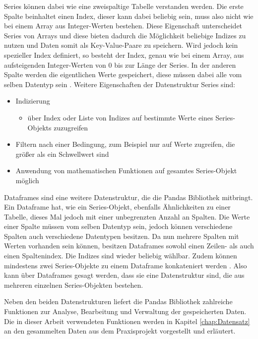 Series können dabei wie eine zweispaltige Tabelle verstanden werden. Die erste Spalte beinhaltet einen Index, dieser kann
dabei beliebig sein, muss also nicht wie bei einem Array aus Integer-Werten bestehen. Diese Eigenschaft unterscheidet Series von Arrays
und diese bieten dadurch die Möglichkeit beliebige Indizes zu nutzen und Daten somit als Key-Value-Paare zu speichern. Wird jedoch kein spezieller Index definiert,
so besteht der Index, genau wie bei einem Array, aus aufsteigenden Integer-Werten von 0 bis zur Länge der Series. In der anderen Spalte
werden die eigentlichen Werte gespeichert, diese müssen dabei alle vom selben Datentyp sein \cite[vgl. S.254f.]{NumerischesPython}. 
Weitere Eigenschaften der Datenstruktur Series sind:
\begin{itemize}
    \item Indizierung \cite[vgl. S.256]{NumerischesPython}
    \begin{itemize}
        \item über Index oder Liste von Indizes auf bestimmte Werte eines Series-Objekts zuzugreifen
    \end{itemize}
    \item Filtern nach einer Bedingung, zum Beispiel nur auf Werte zugreifen, die größer als ein Schwellwert sind \cite[vgl. S.256]{NumerischesPython}
    \item Anwendung von mathematischen Funktionen auf gesamtes Series-Objekt möglich \cite[vgl. S.256]{NumerischesPython}
\end{itemize}

Dataframes sind eine weitere Datenstruktur, die die Pandas Bibliothek mitbringt. Ein Dataframe hat, wie ein Series-Objekt, ebenfalls Ähnlichkeiten zu einer Tabelle,
dieses Mal jedoch mit einer unbegrenzten Anzahl an Spalten. Die Werte einer Spalte müssen vom selben Datentyp sein, jedoch können verschiedene Spalten 
auch verschiedene Datentypen besitzen. Da nun mehrere Spalten mit Werten vorhanden sein können, besitzen Dataframes sowohl einen Zeilen- als auch einen
Spaltenindex. Die Indizes sind wieder beliebig wählbar. Zudem können mindestens zwei Series-Objekte zu einem Dataframe
konkateniert werden \cite[vgl. S.263f.]{NumerischesPython}. Also kann über Dataframes gesagt werden, dass sie eine Datenstruktur sind, die aus mehreren einzelnen Series-Objekten bestehen.

Neben den beiden Datenstrukturen liefert die Pandas Bibliothek zahlreiche Funktionen zur Analyse, Bearbeitung und Verwaltung der gespeicherten Daten. Die in dieser Arbeit 
verwendeten Funktionen werden in Kapitel \ref*{chap:Datensatz} an den gesammelten Daten aus dem Praxisprojekt vorgestellt und erläutert.

